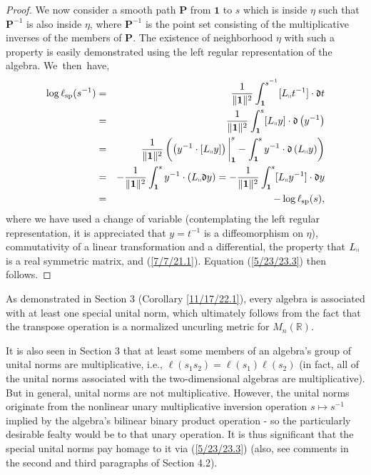 \documentclass{amsart}
\numberwithin{equation}{section}
\theoremstyle{definition}
\numberwithin{theorem}{section}
\begin{document}
\begin{proof}
\enlargethispage{2cm}
We now consider a smooth path $\mathbf{P}$ from $\mathbf{1}$ to $s$ which is inside $\eta$  such that $\mathbf{P}^{-1}$ is also inside $\eta$,  where $\mathbf{P}^{-1}$ is the point set consisting of the multiplicative inverses of the members of $\mathbf{P}$.  The  existence of neighborhood $\eta$ with such a property  is  easily demonstrated using the left regular representation of the algebra.
\mbox{We then have,} \begin{eqnarray}  \log \ell_{\rm sp}(s^{-1})   &=&   \frac{1}{\|{\bf 1}\|^2} \int_{\bf 1}^{s^{-1}} [L_{\shortparallel}t^{-1}] \cdot \mathfrak{d}t \nonumber \\ &=&  \frac{1}{\|{\bf 1}\|^2} \int_{\bf 1}^s [L_{\shortparallel}y]\cdot \mathfrak{d}\left(y^{-1}\right) \nonumber \\ &=&  \frac{1}{\|{\bf 1}\|^2}\left(\left(y^{-1}\cdot [L_{\shortparallel}y]\right)\bigg|_{\bf 1}^s - \int_{\bf 1}^s y^{-1}\cdot \mathfrak{d}\left(L_{\shortparallel}y\right)\right)   \nonumber \\ &=& -\frac{1}{\|{\bf 1}\|^2} \int_{\bf 1}^s y^{-1}\cdot (L_{\shortparallel}\mathfrak{d}y) = -\frac{1}{\|{\bf 1}\|^2} \int_{\bf 1}^s [L_{\shortparallel}y^{-1}] \cdot \mathfrak{d}y  \nonumber \\ &=& -\log \ell_{\rm sp}(s),\label{4/2/23.5} \end{eqnarray} where we have used a change of variable (contemplating the left regular representation, it is appreciated that $y=t^{-1}$ is a diffeomorphism on $\eta$), commutativity of a linear transformation and a differential, the property that $L_{\shortparallel}$ is a real symmetric matrix, and  (\ref{7/7/21.1}).  Equation (\ref{5/23/23.3}) then follows.
\end{proof}



As demonstrated in Section 3 (Corollary \ref{11/17/22.1}), every algebra is associated with at least one special unital norm, which ultimately follows from the fact that the transpose operation is a normalized uncurling metric for $M_n(\mathbb{R})$.

It is also seen in Section 3 that at least some members of an algebra's group of unital norms are multiplicative, i.e., $\ell(s_1s_2) = \ell(s_1)\ell(s_2)$ (in fact, all of the unital norms associated with the two-dimensional algebras are multiplicative).   But in general, unital norms are not multiplicative.  However, the unital norms originate from the nonlinear unary multiplicative inversion operation $s\mapsto s^{-1}$ implied by the algebra's bilinear binary product operation - so the particularly desirable fealty would be to that unary operation.  It is thus significant that the special unital norms pay homage to it via (\ref{5/23/23.3}) (also, see comments in the second and third paragraphs of Section 4.2).
\end{document}
